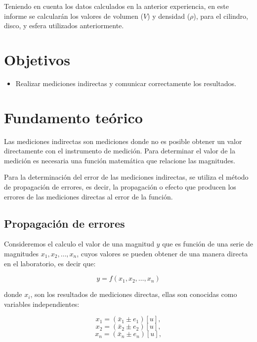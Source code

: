\documentclass[letter,twoside,11pt]{article}
\begin{document}
Teniendo en cuenta los datos calculados en la anterior experiencia, en este
informe se calcularán los valores de volumen ($V$) y densidad ($\rho$), para
el cilindro, disco, y esfera utilizados anteriormente.

\section{Objetivos}
\begin{itemize}
\item Realizar mediciones indirectas y comunicar correctamente los resultados.
\end{itemize}

\section{Fundamento teórico}
Las mediciones indirectas son mediciones donde no es posible obtener un valor
directamente con el instrumento de medición. Para determinar el valor de la
medición es necesaria una función matemática que relacione las magnitudes.

Para la determinación del error de las mediciones indirectas, se utiliza el
método de propagación de errores, es decir, la propagación o efecto que
producen los errores de las mediciones directas al error de la función.

\subsection{Propagación de errores}
Consideremos el calculo el valor de una magnitud $y$ que es función de una serie
de magnitudes $x_1, x_2, \dots, x_n$, cuyos valores se pueden obtener de una
manera directa en el laboratorio, es decir que:

\begin{equation}
\label{eq:f}
    y = f(x_1,x_2,\dots,x_n)
\end{equation}

donde $x_i$, son los resultados de mediciones directas, ellas son conocidas como
variables independientes:

\begin{equation}x_1 = (\bar{x}_1 \pm e_1)[u],\end{equation}
\begin{equation}x_2 = (\bar{x}_2 \pm e_2)[u],\end{equation}
\begin{equation}x_n = (\bar{x}_n \pm e_n)[u],\end{equation}
\end{document}
